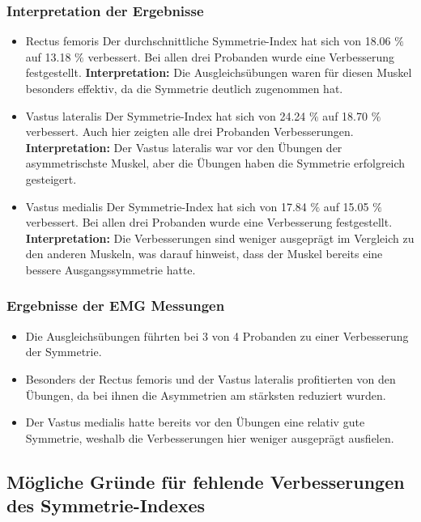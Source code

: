 \subsubsection{Interpretation der Ergebnisse}
\begin{itemize}
    \item Rectus femoris
    Der durchschnittliche Symmetrie-Index hat sich von 18.06 $\%$ auf 13.18 $\%$ verbessert.
    Bei allen drei Probanden wurde eine Verbesserung festgestellt.
    \textbf{Interpretation:} Die Ausgleichsübungen waren für diesen Muskel besonders effektiv, da die Symmetrie deutlich zugenommen hat.
    \item Vastus lateralis
    Der Symmetrie-Index hat sich von 24.24 $\%$ auf 18.70 $\%$ verbessert.
    Auch hier zeigten alle drei Probanden Verbesserungen.
    \textbf{Interpretation:} Der Vastus lateralis war vor den Übungen der asymmetrischste Muskel, aber die Übungen haben die Symmetrie erfolgreich gesteigert.
    \item Vastus medialis
    Der Symmetrie-Index hat sich von 17.84 $\%$ auf 15.05 $\%$ verbessert.
    Bei allen drei Probanden wurde eine Verbesserung festgestellt.
    \textbf{Interpretation:} Die Verbesserungen sind weniger ausgeprägt im Vergleich zu den anderen Muskeln, was darauf hinweist, dass der Muskel bereits eine bessere Ausgangssymmetrie hatte.
\end{itemize}

\subsubsection{Ergebnisse der EMG Messungen}
\begin{itemize}
    \item Die Ausgleichsübungen führten bei 3 von 4 Probanden zu einer Verbesserung der Symmetrie.
    \item Besonders der Rectus femoris und der Vastus lateralis profitierten von den Übungen, da bei ihnen die Asymmetrien am stärksten reduziert wurden.
    \item Der Vastus medialis hatte bereits vor den Übungen eine relativ gute Symmetrie, weshalb die Verbesserungen hier weniger ausgeprägt ausfielen.
\end{itemize}

\subsection{Mögliche Gründe für fehlende Verbesserungen des Symmetrie-Indexes}

